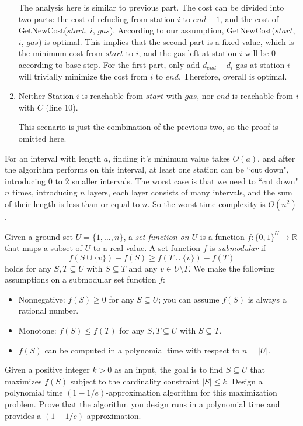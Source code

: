 \documentclass{oxmathproblems}
\begin{document}
\begin{questions}
\begin{Solution}
\begin{parts}
\begin{enumerate}
    The analysis here is similar to previous part. The cost can be divided into two parts: the cost of refueling from station $i$ to $end-1$, and the cost of GetNewCost($start$, $i$, $gas$). According to our assumption, GetNewCost($start$, $i$, $gas$) is optimal. This implies that the second part is a fixed value, which is the minimum cost from $start$ to $i$, and the gas left at station $i$ will be $0$ according to base step. For the first part, only add $d_{end}-d_i$ gas at station $i$ will trivially minimize the cost from $i$ to $end$. Therefore, overall is optimal. 
    
    \item Neither Station $i$ is reachable from $start$ with $gas$, nor $end$ is reachable from $i$ with $C$ (line 10).

    This scenario is just the combination of the previous two, so the proof is omitted here.
    
\end{enumerate}

\vspace{0.5cm}

For an interval with length $a$, finding it's minimum value takes $O(a)$, and after the algorithm performs on this interval, at least one station can be ``cut down", introducing $0$ to $2$ smaller intervals. The worst case is that we need to ``cut down" $n$ times, introducing $n$ layers, each layer consists of many intervals, and the sum of their length is less than or equal to $n$. So the worst time complexity is $O(n^2)$.




\end{parts}
\end{Solution}
\newpage


\miquestion[25]
  Given a ground set $U=\{1,\ldots,n\}$, a \emph{set function on $U$} is a function $f:\{0,1\}^U\to\mathbb{R}$ that maps a subset of $U$ to a real value.
  A set function $f$ is \emph{submodular} if
  $$f(S\cup\{v\})-f(S)\geq f(T\cup\{v\})-f(T)$$
  holds for any $S,T\subseteq U$ with $S\subseteq T$ and any $v\in U\setminus T$.
  We make the following assumptions on a submodular set function $f$:
  \begin{itemize}
    \item Nonnegative: $f(S)\geq0$ for any $S\subseteq U$; you can assume $f(S)$ is always a rational number.
    \item Monotone: $f(S)\leq f(T)$ for any $S,T\subseteq U$ with $S\subseteq T$.
    \item $f(S)$ can be computed in a polynomial time with respect to $n=|U|$.
  \end{itemize}
  Given a positive integer $k>0$ as an input, the goal is to find $S\subseteq U$ that maximizes $f(S)$ subject to the cardinality constraint $|S|\leq k$.
  Design a polynomial time $(1-1/e)$-approximation algorithm for this maximization problem.
  Prove that the algorithm you design runs in a polynomial time and provides a $(1-1/e)$-approximation.


\end{questions}
\end{document}
